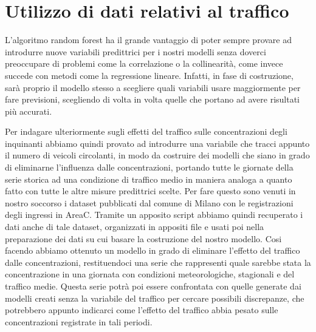 \documentclass[a4paper]{report}
\begin{document}
\section{Utilizzo di dati relativi al traffico}
L'algoritmo random forest ha il grande vantaggio di poter sempre provare ad introdurre nuove variabili predittrici per i nostri modelli senza doverci preoccupare di problemi come la correlazione o la collinearità, come invece succede con metodi come la regressione lineare. Infatti, in fase di costruzione, sarà proprio il modello stesso a scegliere quali variabili usare maggiormente per fare previsioni, scegliendo di volta in volta quelle che portano ad avere risultati più accurati.

Per indagare ulteriormente sugli effetti del traffico sulle concentrazioni degli inquinanti abbiamo quindi provato ad introdurre una variabile che tracci appunto il numero di veicoli circolanti, in modo da costruire dei modelli che siano in grado di eliminarne l'influenza dalle concentrazioni, portando tutte le giornate della serie storica ad una condizione di traffico medio in maniera analoga a quanto fatto con tutte le altre misure predittrici scelte.
Per fare questo sono venuti in nostro soccorso i dataset \cite{areac2012, areac2013, areac2014, areac2015, areac2016, areac2017, areac2018, areac20192020}
 pubblicati dal comune di Milano con le registrazioni degli ingressi in AreaC. Tramite un apposito script
 abbiamo quindi recuperato i dati anche di tale dataset, organizzati in appositi file e usati poi nella preparazione dei dati su cui basare la costruzione del nostro modello. Cosi facendo abbiamo ottenuto un modello in grado di eliminare l'effetto del traffico dalle concentrazioni, restituendoci una serie che rappresenti quale sarebbe stata la concentrazione in una giornata con condizioni meteorologiche, stagionali e del traffico medie. Questa serie potrà poi essere confrontata con quelle generate dai modelli creati senza la variabile del traffico per cercare possibili discrepanze, che potrebbero appunto indicarci come l'effetto del traffico abbia pesato sulle concentrazioni registrate in tali periodi.
\end{document}
